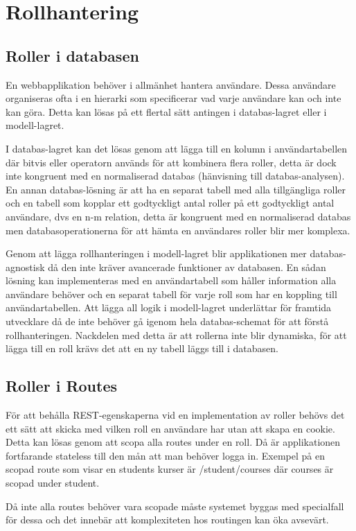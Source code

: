 \section{Rollhantering}

\subsection{Roller i databasen}

En webbapplikation behöver i allmänhet hantera användare. Dessa användare organiseras ofta i en hierarki som specificerar vad varje användare kan och inte kan göra. Detta kan lösas på ett flertal sätt antingen i databas-lagret eller i modell-lagret.

I databas-lagret kan det lösas genom att lägga till en kolumn i användartabellen där bitvis eller 
operatorn används för att kombinera flera roller, detta är dock inte kongruent med en normaliserad databas (hänvisning till databas-analysen). En annan databas-lösning är att ha en separat tabell med alla tillgängliga roller och en tabell som kopplar ett godtyckligt antal roller på ett godtyckligt antal användare, dvs en n-m relation, detta är kongruent med en normaliserad databas men databasoperationerna för att hämta en användares roller blir mer komplexa.

Genom att lägga rollhanteringen i modell-lagret blir applikationen mer databas-agnostisk då den inte kräver avancerade funktioner av databasen. En sådan lösning kan implementeras med en användartabell som håller information alla användare behöver och en separat tabell för varje roll som har en koppling till användartabellen. Att lägga all logik i modell-lagret underlättar för framtida utvecklare då de inte behöver gå igenom hela databas-schemat för att förstå rollhanteringen. Nackdelen med detta är att rollerna inte blir dynamiska, för att lägga till en roll krävs det att en ny tabell läggs till i databasen.

\subsection{Roller i Routes}

För att behålla REST-egenskaperna vid en implementation av roller behövs det ett sätt att skicka med vilken roll en användare har utan att skapa en cookie. Detta kan lösas genom att scopa alla routes under en roll. Då är applikationen fortfarande stateless till den mån att man behöver logga in. 
Exempel på en scopad route som visar en students kurser är /student/courses där courses är scopad under student.

Då inte alla routes behöver vara scopade måste systemet byggas med specialfall för dessa och det innebär att komplexiteten hos routingen kan öka avsevärt.